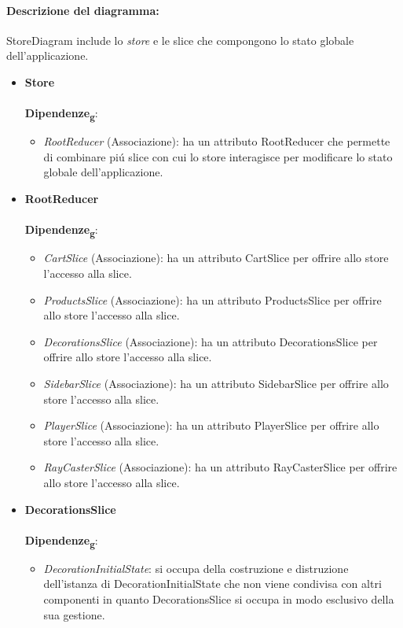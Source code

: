 \paragraph*{Descrizione del diagramma:}
StoreDiagram include lo \textit{store} e le slice che compongono lo stato globale dell'applicazione.
\begin{itemize}
		\item \textbf{Store}
		\\\\
		\textbf{Dipendenze\textsubscript{g}}:
		\begin{itemize}
			\item \textit{RootReducer} (Associazione): ha un attributo RootReducer che permette di combinare piú slice con cui lo store interagisce 
			per modificare lo stato globale dell'applicazione.
		\end{itemize}
		\item \textbf{RootReducer}
		\\\\
		\textbf{Dipendenze\textsubscript{g}}:
		\begin{itemize}
			\item \textit{CartSlice} (Associazione): ha un attributo CartSlice per offrire allo store l'accesso alla slice.
			\item \textit{ProductsSlice} (Associazione): ha un attributo ProductsSlice per offrire allo store l'accesso alla slice.
			\item \textit{DecorationsSlice} (Associazione): ha un attributo DecorationsSlice per offrire allo store l'accesso alla slice.
			\item \textit{SidebarSlice} (Associazione): ha un attributo SidebarSlice per offrire allo store l'accesso alla slice.
			\item \textit{PlayerSlice} (Associazione): ha un attributo PlayerSlice per offrire allo store l'accesso alla slice.
			\item \textit{RayCasterSlice} (Associazione): ha un attributo RayCasterSlice per offrire allo store l'accesso alla slice.
		\end{itemize}
		\item \textbf{DecorationsSlice}
		\\\\
		\textbf{Dipendenze\textsubscript{g}}:
		\begin{itemize}
			\item \textit{DecorationInitialState}: si occupa della costruzione e distruzione dell'istanza di DecorationInitialState
			che non viene condivisa con altri componenti in quanto DecorationsSlice si occupa in modo esclusivo della sua gestione.
		\end{itemize}


\end{itemize}

